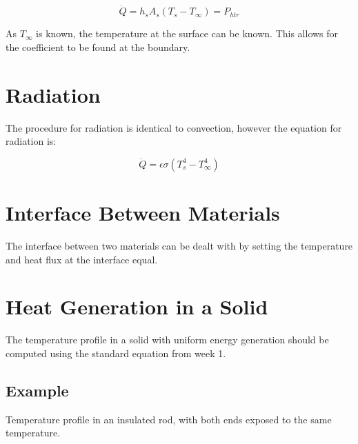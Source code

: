 \documentclass[•]{article}
\begin{document}
\begin{equation}
\dot{Q} = h_sA_s(T_s - T_{\infty}) = P_{htr}
\end{equation}

As $T_{\infty}$ is known, the temperature at the surface can be known. This allows for the coefficient to be found at the boundary.

\section*{Radiation}
The procedure for radiation is identical to convection, however the equation for radiation is:

\begin{equation}
\dot{Q} = \epsilon\sigma(T_s^4 - T_{\infty}^4)
\end{equation}

\section*{Interface Between Materials}
The interface between two materials can be dealt with by setting the temperature and heat flux at the interface equal.

\section*{Heat Generation in a Solid}
The temperature profile in a solid with uniform energy generation should be computed using the standard equation from week 1.

\subsection*{Example}
Temperature profile in an insulated rod, with both ends exposed to the same temperature.
\end{document}
